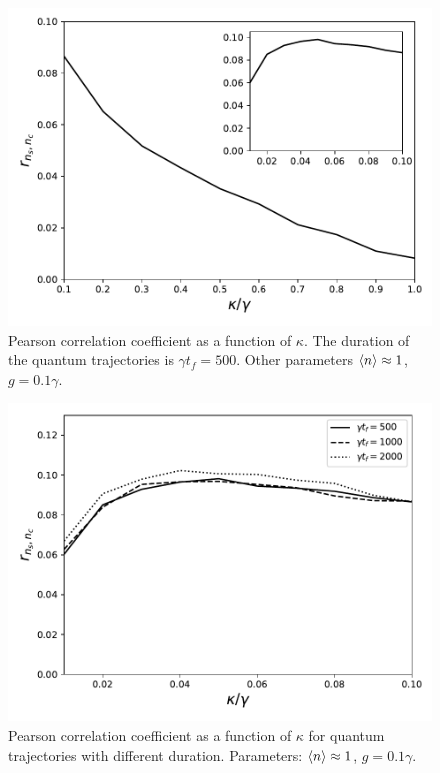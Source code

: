 \documentclass[epj,final]{svjour}
\begin{document}
\begin{center}
\begin{figure}[t!]
\begin{center}
\includegraphics[scale = 0.5]{million1.pdf}
\caption{Pearson correlation coefficient as a function of $\kappa$.
  The duration of the quantum trajectories is  $\gamma t_f = 500$.
  Other parameters $\expval{n} \approx 1$, $g = 0.1\gamma$.} \label{corrxy}
\end{center}  
\end{figure}
\end{center}

\begin{center}
\begin{figure}[h!]
\begin{center}
\includegraphics[scale = 0.5]{million2.pdf}
\caption{Pearson correlation coefficient as a function of $\kappa$ for
  quantum trajectories with different duration. Parameters:
  $\expval{n} \approx 1$, $g = 0.1\gamma$.} \label{errorzz}
\end{center}
\end{figure}
\end{center}
\end{document}
